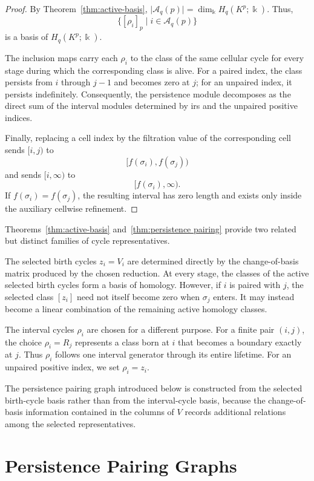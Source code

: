 \documentclass[11pt]{article}
\theoremstyle{paperdefinition}
\theoremstyle{paperplain}
\theoremstyle{paperremark}
\begin{document}
\begin{proof}
By Theorem~\ref{thm:active-basis}, $\lvert\mathcal A_q(p)\rvert = \dim_{\Bbbk}H_q(K^p;\Bbbk)$. Thus,
\[
\{[\rho_i]_p\mid i\in\mathcal A_q(p)\}
\]
is a basis of $H_q(K^p;\Bbbk)$.

The inclusion maps carry each $\rho_i$ to the class of the same cellular cycle for every stage during which the corresponding class is alive. For a paired index, the class persists from $i$ through $j-1$ and becomes zero at $j$; for an unpaired index, it persists indefinitely. Consequently, the persistence module decomposes as the direct sum of the interval modules determined by irs and the unpaired positive indices.

Finally, replacing a cell index by the filtration value of the corresponding cell sends $[i,j)$ to
\[
[f(\sigma_i),f(\sigma_j))
\]
and sends $[i,\infty)$ to
\[
[f(\sigma_i),\infty).
\]
If $f(\sigma_i)=f(\sigma_j)$, the resulting interval has zero length and exists only inside the auxiliary cellwise refinement.
\end{proof}

Theorems~\ref{thm:active-basis} and~\ref{thm:persistence pairing} provide two related but distinct families of cycle representatives.

The selected birth cycles $z_i=V_i$ are determined directly by the change-of-basis matrix produced by the chosen reduction. At every stage, the classes of the active selected birth cycles form a basis of homology. However, if $i$ is paired with $j$, the selected class $[z_i]$ need not itself become zero when $\sigma_j$ enters. It may instead become a linear combination of the remaining active homology classes.

The interval cycles $\rho_i$ are chosen for a different purpose. For a finite pair $(i,j)$, the choice $\rho_i=R_j$ represents a class born at $i$ that becomes a boundary exactly at $j$. Thus $\rho_i$ follows one interval generator through its entire lifetime. For an unpaired positive index, we set $\rho_i=z_i$.

The persistence pairing graph introduced below is constructed from the selected birth-cycle basis rather than from the interval-cycle basis, because the change-of-basis information contained in the columns of $V$ records additional relations among the selected representatives.

\section{Persistence Pairing Graphs}
\label{sec:persistence pairing-graphs}
\end{document}
